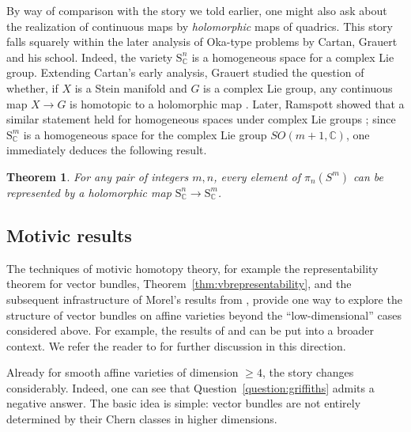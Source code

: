 \documentclass[11pt,leqno]{article}
\newcommand{\cplx}{{\mathbb C}}
\renewcommand{\1}{{\rm 1\hspace*{-0.4ex}%
\rule{0.1ex}{1.52ex}\hspace*{0.2ex}}}
\newcommand{\<}[1]{{\langle}#1 {\rangle}}
\theoremstyle{plain}
\newtheorem{theorem}{Theorem}[subsection]
\theoremstyle{definition}
\theoremstyle{remark}
\numberwithin{equation}{subsection}
\begin{document}
By way of comparison with the story we told earlier, one might also ask about the realization of continuous maps by {\em holomorphic} maps of quadrics.  This story falls squarely within the later analysis of Oka-type problems by Cartan, Grauert and his school.  Indeed, the variety $\mathrm{S}^n_{\cplx}$ is a homogeneous space for a complex Lie group.  Extending Cartan's early analysis, Grauert studied the question of whether, if $X$ is a Stein manifold and $G$ is a complex Lie group, any continuous map $X \to G$ is homotopic to a holomorphic map \cite{Grauert1957Holomorphe}.  Later, Ramspott showed that a similar statement held for homogeneous spaces under complex Lie groups \cite{Ramspeott1965Schnitte}; since $\mathrm{S}^m_{\cplx}$ is a homogeneous space for the complex Lie group $SO(m+1,\cplx)$, one immediately deduces the following result.

\begin{theorem}
	\label{thm:holomorphicrepresentatives}
	For any pair of integers $m,n$, every element of $\pi_n(S^m)$ can be represented by a holomorphic map $\mathrm{S}^n_{\cplx} \to \mathrm{S}^m_{\cplx}$.
\end{theorem}  

\subsection{Motivic results}
\label{ss:motivicresults}
The techniques of motivic homotopy theory, for example the representability theorem for vector bundles, Theorem~\ref{thm:vbrepresentability}, and the subsequent infrastructure of Morel's results from \cite{MField}, provide one way to explore the structure of vector bundles on affine varieties beyond the ``low-dimensional'' cases considered above.  For example, the results of \cite{MurthySwan1976VectorBundlesAffineSurfaces} and \cite{KumarMurthy1982AlgebraicCyclesAffineThreefolds} can be put into a broader context.  We refer the reader to \cite{AsokFasel2022VectorBundles} for further discussion in this direction.

Already for smooth affine varieties of dimension $\geq 4$, the story changes considerably.  Indeed, one can see that Question~\ref{question:griffiths} admits a negative answer.  The basic idea is simple: vector bundles are not entirely determined by their Chern classes in higher dimensions.
\end{document}
